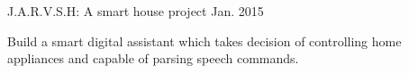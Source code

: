 \begin{cventries}
    {J.A.R.V.S.H: A smart house project}
    {}
    {Jan. 2015}
    {
      \begin{cvitems}
        \item {Build a smart digital assistant which takes decision of controlling home appliances and capable of parsing speech commands.}
      \end{cvitems}
    }
    
\end{cventries}
